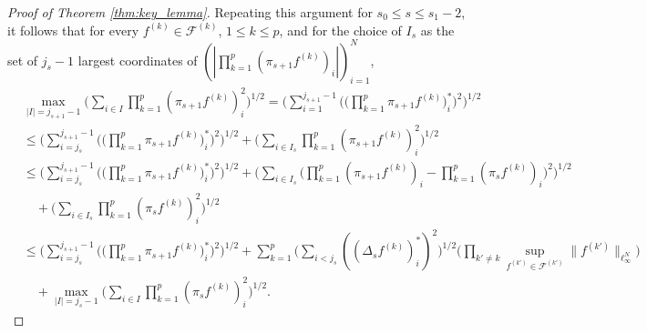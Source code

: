 \documentclass[numbers,webpdf,imaiai]{ima-authoring-template}
\theoremstyle{thmstyletwo}%
\numberwithin{equation}{section}
\numberwithin{equation}{section}
\newcommand{\F}{\mathcal{F}}
\begin{document}
\begin{proof}[Proof of Theorem \ref{thm:key_lemma}]
Repeating this argument for $s_0\le s\le s_1-2$, it follows that for every $f^{(k)}\in \F^{(k)}$, $1\le k\le p$, and for the choice of $I_s$ as the set of $j_s-1$ largest coordinates of $(|\prod_{k=1}^{p}(\pi_{s+1} f^{(k)})_{i}|)_{i=1}^{N}$,
\begin{align*}
    &\max_{|I|=j_{s+1}-1}\bigg(\sum_{i\in I}\prod_{k=1}^{p}(\pi_{s+1} f^{(k)})^2_{i}\bigg)^{1/2}
    = \Bigg(\sum_{i=1}^{j_{s+1}-1}\bigg(\bigg(\prod_{k=1}^{p} \pi_{s+1} f^{(k)}\bigg)_i^*\bigg)^2\Bigg)^{1/2} \\
    &\le \Bigg(\sum_{i=j_{s}}^{j_{s+1}-1}\bigg(\bigg(\prod_{k=1}^{p}\pi_{s+1} f^{(k)}\bigg)_i^{*}\bigg)^{2}\Bigg)^{1 / 2} +\bigg(\sum_{i\in I_s}\prod_{k=1}^{p}(\pi_{s+1} f^{(k)})^2_{i}\bigg)^{1/2}\\
    &\le \Bigg(\sum_{i=j_{s}}^{j_{s+1}-1}\bigg(\bigg(\prod_{k=1}^{p}\pi_{s+1} f^{(k)}\bigg)_i^{*}\bigg)^{2}\Bigg)^{1 / 2}+\Bigg(\sum_{i\in I_{s}} \bigg(\prod_{k=1}^{p}(\pi_{s+1}f^{(k)})_i-\prod_{k=1}^{p}(\pi_{s}f^{(k)})_i\bigg)^2\Bigg)^{1/2}\\
    &\quad + \bigg(\sum_{i\in I_s}\prod_{k=1}^{p}(\pi_{s} f^{(k)})^2_{i}\bigg)^{1/2} \\
    &\le \Bigg(\sum_{i=j_{s}}^{j_{s+1}-1}\bigg(\bigg(\prod_{k=1}^{p}\pi_{s+1} f^{(k)}\bigg)_i^{*}\bigg)^{2}\Bigg)^{1 / 2}+ \sum_{k=1}^{p} \bigg(\sum_{i<j_{s}}\left(\left(\Delta_{s} f^{(k)}\right)_i^*\right)^2\bigg)^{1 / 2}\bigg(\prod_{k'\ne k}\sup_{f^{(k')}\in \F^{(k')}} \|f^{(k')}\|_{\ell^N_{\infty}}\bigg)\\
    &\quad + \max_{|I|=j_{s}-1}\bigg(\sum_{i\in I}\prod_{k=1}^{p}(\pi_{s} f^{(k)})^2_{i}\bigg)^{1/2}.
\end{align*}


\end{proof}
\end{document}
